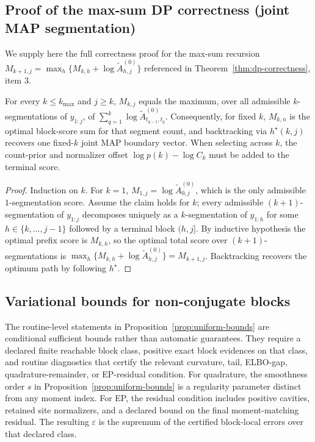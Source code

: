 \subsection{Proof of the max-sum DP correctness (joint MAP segmentation)}
\label{app:max-sum-proof}

We supply here the full correctness proof for the max-sum recursion
$M_{k+1,j}=\max_h\{M_{k,h}+\log\widetilde A^{(0)}_{h,j}\}$ referenced in
Theorem~\ref{thm:dp-correctness}, item 3.

\begin{proposition}
For every $k\le k_{\max}$ and $j\ge k$, $M_{k,j}$ equals the maximum, over all admissible
$k$-segmentations of $y_{1:j}$, of $\sum_{q=1}^k \log\widetilde A^{(0)}_{t_{q-1},t_q}$.
Consequently, for fixed $k$, $M_{k,n}$ is the optimal block-score sum for that segment count, and backtracking via
$h^\star(k,j)$ recovers one fixed-$k$ joint MAP boundary vector. When selecting across $k$, the
count-prior and normalizer offset $\log p(k)-\log C_k$ must be added to the terminal score.
\end{proposition}

\begin{proof}
Induction on $k$. For $k=1$, $M_{1,j}=\log\widetilde A^{(0)}_{0,j}$, which is the only admissible
$1$-segmentation score. Assume the claim holds for $k$; every admissible $(k+1)$-segmentation of
$y_{1:j}$ decomposes uniquely as a $k$-segmentation of $y_{1:h}$ for some $h\in\{k,\dots,j-1\}$
followed by a terminal block $(h,j]$. By inductive hypothesis the optimal prefix score is
$M_{k,h}$, so the optimal total score over $(k+1)$-segmentations is
$\max_h\{M_{k,h}+\log\widetilde A^{(0)}_{h,j}\}=M_{k+1,j}$. Backtracking recovers the optimum
path by following $h^\star$.
\end{proof}

\subsection{Variational bounds for non-conjugate blocks}
\label{app:variational-bounds}

The routine-level statements in Proposition~\ref{prop:uniform-bounds} are conditional sufficient
bounds rather than automatic guarantees. They require a declared finite reachable block class,
positive exact block evidences on that class, and routine diagnostics that certify the relevant
curvature, tail, ELBO-gap, quadrature-remainder, or EP-residual condition. For quadrature, the
smoothness order $s$ in Proposition~\ref{prop:uniform-bounds} is a regularity parameter distinct from
any moment index. For EP, the residual condition includes positive cavities, retained site
normalizers, and a declared bound on the final moment-matching residual. The resulting
$\varepsilon$ is the supremum of the certified block-local errors over that declared class.

